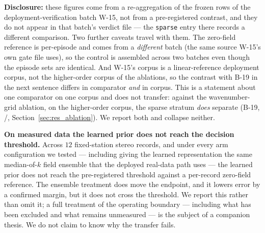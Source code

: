 \documentclass[review]{elsarticle}
\begin{document}
\textbf{Disclosure:} these figures come from a re-aggregation of the frozen rows
of the deployment-verification batch W-15, not from a pre-registered contrast, and
they do not appear in that batch's verdict file --- the \texttt{sparse} entry there
records a different comparison. Two further caveats travel with them. The zero-field
reference is per-episode and comes from a \emph{different} batch (the same source
W-15's own gate file uses), so the control is assembled across two batches even
though the episode sets are identical. And W-15's corpus is a linear-reference
deployment corpus, not the higher-order corpus of the ablations, so the contrast with
B-19 in the next sentence differs in comparator \emph{and} in corpus.
This is a statement about one
comparator on one corpus and does not transfer: against the wavenumber-grid ablation,
on the higher-order corpus, the sparse stratum \emph{does} separate (B-19,
\BNineteenBetter{}/\BNineteenN{}, Section~\ref{sec:res_ablation}). We report both and
collapse neither.

\textbf{On measured data the learned prior does not reach the decision
threshold.} Across $12$
fixed-station stereo records, and under every arm configuration we tested --- including
giving the learned representation the same median-of-$k$ field ensemble that the
deployed real-data path uses --- the learned prior does not reach the pre-registered
threshold against a per-record zero-field reference. The ensemble treatment does move
the endpoint, and it lowers error by a confirmed margin, but it does not cross the
threshold. We report this rather than omit it; a full treatment of the operating
boundary --- including what has been excluded and what remains unmeasured --- is the
subject of a companion thesis. We do not claim to know why the transfer fails.
\end{document}
